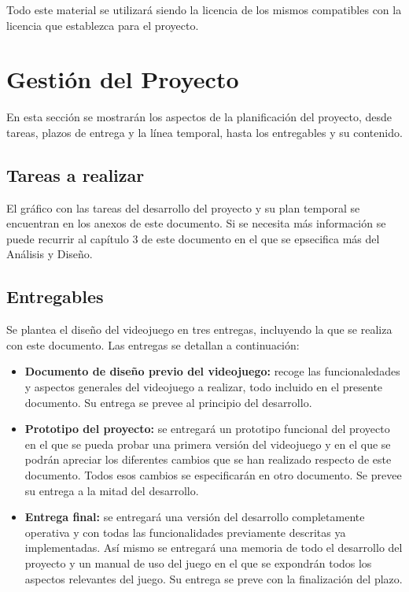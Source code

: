 \documentclass[palatino]{apuntes}
\begin{document}
Todo este material se utilizará siendo la licencia de los mismos compatibles con la licencia que establezca para el proyecto.










\chapter{Gestión del Proyecto}
En esta sección se mostrarán los aspectos de la planificación del proyecto, desde tareas, plazos de entrega y la línea temporal, hasta los entregables y su contenido.

\section{Tareas a realizar}
El gráfico con las tareas del desarrollo del proyecto y su plan temporal se encuentran en los anexos de este documento. Si se necesita más información se puede recurrir al capítulo 3 de este documento en el que se epsecifica más del Análisis y Diseño.

\section{Entregables}

Se plantea el diseño del videojuego en tres entregas, incluyendo la que se realiza con este documento. Las entregas se detallan a continuación:

\begin{itemize}
	\item \textbf{Documento de diseño previo del videojuego:} recoge las funcionaledades y aspectos generales del videojuego a realizar, todo incluido en el presente documento. Su entrega se prevee al principio del desarrollo.
	\item \textbf{Prototipo del proyecto:} se entregará un prototipo funcional del proyecto en el que se pueda probar una primera versión del videojuego y en el que se podrán apreciar los diferentes cambios que se han realizado respecto de este documento. Todos esos cambios se especificarán en otro documento. Se prevee su entrega a la mitad del desarrollo.
	\item \textbf{Entrega final:} se entregará una versión del desarrollo completamente operativa y con todas las funcionalidades previamente descritas ya implementadas. Así mismo se entregará una memoria de todo el desarrollo del proyecto y un manual de uso del juego en el que se expondrán todos los aspectos relevantes del juego. Su entrega se preve con la finalización del plazo.
\end{itemize}
\end{document}
